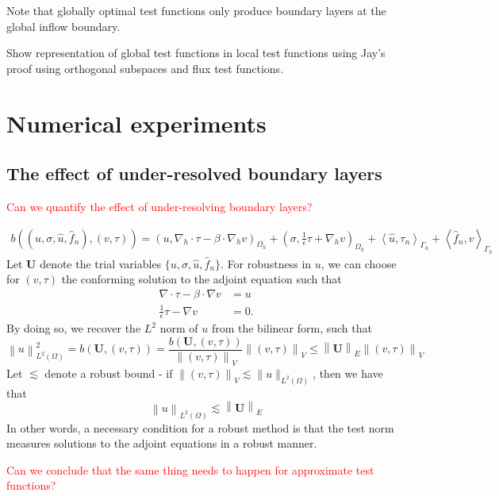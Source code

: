 \documentclass[11pt,onecolumn]{scrartcl}
\newcommand{\nor}[1]{\left\| #1 \right\|}
\newcommand{\LRp}[1]{\left( #1 \right)}
\newcommand{\LRa}[1]{\left\langle #1 \right\rangle}
\newcommand{\Grad} {\ensuremath{\nabla}}
\newcommand{\uh}{\widehat{u}}
\newcommand{\fnh}{\widehat{f}_n}
\newcommand{\Gh}{\Gamma_h}
\newcommand{\Oh}{\Omega_h}
\newcommand{\grad}{\nabla}
\renewcommand{\div}{\grad \cdot}
\begin{document}
Note that globally optimal test functions only produce boundary layers at the global inflow boundary. 

Show representation of global test functions in local test functions using Jay's proof using orthogonal subspaces and flux test functions. 

\section{Numerical experiments}

\subsection{The effect of under-resolved boundary layers}

\textcolor{red}{Can we quantify the effect of under-resolving boundary layers?}

\begin{align*}
b\LRp{\LRp{u,\sigma, \uh,\fnh},\LRp{v,\tau}} = \LRp{u, \Grad_h\cdot \tau - \beta\cdot \Grad_h v}_{\Oh} + \LRp{\sigma, \frac{1}{\epsilon}\tau + \Grad_h v}_{\Oh} + \LRa{\uh,\tau_n}_{\Gh} + \LRa{\fnh,v}_{\Gh}
\end{align*}
Let $\boldsymbol U$ denote the trial variables $\{u,\sigma, \uh, \fnh\}$. For robustness in $u$, we can choose for $\LRp{v,\tau}$ the conforming solution to the adjoint equation such that 
\begin{align*}
\div \tau - \beta \cdot \grad v &= u \\
\frac{1}{\epsilon} \tau - \grad v &= 0. 
\end{align*}
By doing so, we recover the $L^2$ norm of $u$ from the bilinear form, such that
\[
\nor{u}^2_{L^2(\Omega)} = b\LRp{{\boldsymbol U},\LRp{v,\tau}} = \frac{b\LRp{{\boldsymbol U},\LRp{v,\tau}}}{\nor{\LRp{v,\tau}}_V} \nor{\LRp{v,\tau}}_V \leq \nor{\boldsymbol U}_E \nor{\LRp{v,\tau}}_V
\]
Let $\lesssim$ denote a robust bound - if $ \nor{\LRp{v,\tau}}_V \lesssim \|u\|_{L^2(\Omega)}$, then we have that
\[
\nor{u}_{L^2(\Omega)} \lesssim \nor{\boldsymbol U}_E
\]
In other words, a necessary condition for a robust method is that the test norm measures solutions to the adjoint equations in a robust manner. 

\textcolor{red}{Can we conclude that the same thing needs to happen for approximate test functions?}
\end{document}
